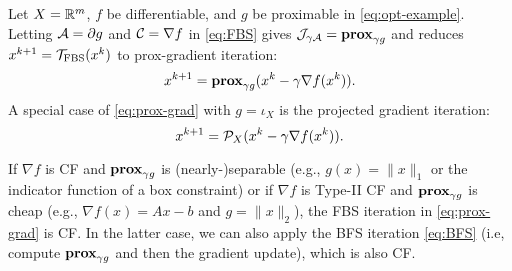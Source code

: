 {\begin{example}\label{alg:prox-grad} Let $X=\mathbb{R}^m$, $f$ be differentiable, and $g$ be proximable in \eqref{eq:opt-example}. Letting ${\mathcal{A}}=\partial g$ and ${\mathcal{C}}=\nabla f$ in \eqref{eq:FBS} gives ${\mathcal{J}}_{\gamma {\mathcal{A}}}=\mathbf{prox}_{\gamma g}$ and reduces $x^{k+1}={{\mathcal{T}}_{\mathrm{FBS}}}(x^k)$ to prox-gradient iteration: 
\begin{equation}\label{eq:prox-grad}x^{k+1}=\prox_{\gamma g}(x^k-\gamma\nabla f(x^k)).
\end{equation} 
A special case of \eqref{eq:prox-grad} with $g=\iota_X$ is the projected gradient iteration:
\begin{equation}\label{eq:proj-grad}
x^{k+1}=\cP_X(x^k-\gamma \nabla f(x^k)).
\end{equation}

If $\nabla f$ is CF and $\mathbf{prox}_{\gamma g}$ is (nearly-)separable (e.g., $g(x)=\|x\|_1$ or the indicator function of a box constraint) or if $\nabla f$ is Type-II CF and $\mathbf{prox}_{\gamma g}$ is cheap (e.g., $\nabla f(x)=Ax-b$ and $g=\|x\|_2$), the FBS iteration in \eqref{eq:prox-grad} is CF. In the latter case, we can also apply the BFS iteration \eqref{eq:BFS} (i.e,  compute $\mathbf{prox}_ {\gamma g}$ and then the gradient update), which is also CF.

\end{example}


}
